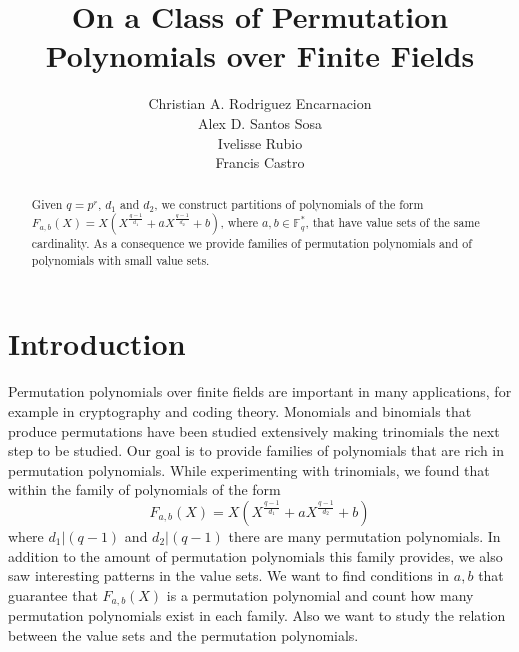 \documentclass{article}
\theoremstyle{definition}
\theoremstyle{remark}
\numberwithin{equation}{section}
\begin{document}
\title{On a Class of Permutation Polynomials over Finite Fields}

\author{Christian A. Rodriguez Encarnacion \\ Alex D. Santos Sosa \\ Ivelisse Rubio \\ Francis Castro}

\maketitle

\begin{abstract}
Given $q=p^r$, $d_1$ and $d_2$, we construct partitions of polynomials of the form $F_{a,b}(X) =X\left(X^{\frac{q-1}{d_1}} + a X^{\frac{q-1}{d_2}} + b \right)$, where $a,b \in \mathbb{F}_{q}^{*}$, that have value sets of the same cardinality. As a consequence we provide families of permutation polynomials and of polynomials with small value sets. 

\end{abstract}


\section{Introduction}

Permutation polynomials over finite fields are important in many applications, for example in cryptography and coding theory. Monomials and binomials that produce permutations have been studied extensively making trinomials the next step to be studied. Our goal is to provide families of polynomials that are rich in permutation polynomials. While experimenting with trinomials, we found that within the family of polynomials of the form $$F_{a,b}(X) = X(X^{\frac{q-1}{d_1}} + aX^{\frac{q-1}{d_2}} +b)$$ where $d_1 | (q-1)$ and $d_2 | (q-1)$  there are many permutation polynomials. In addition to the amount of permutation polynomials this family provides, we also saw interesting patterns in the value sets. We want to find conditions in $a,b$ that guarantee that $F_{a,b}(X)$ is a permutation polynomial and count how many permutation polynomials exist in each family. Also we want to study the relation between the value sets and the permutation polynomials. 
\end{document}
